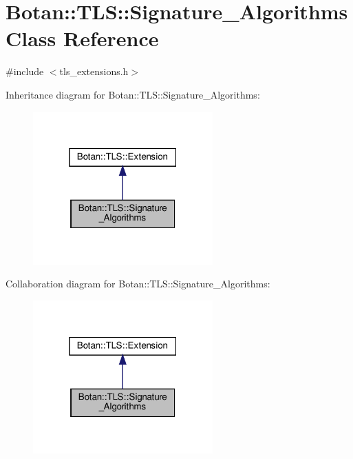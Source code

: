 \hypertarget{class_botan_1_1_t_l_s_1_1_signature___algorithms}{}\section{Botan\+:\+:T\+LS\+:\+:Signature\+\_\+\+Algorithms Class Reference}
\label{class_botan_1_1_t_l_s_1_1_signature___algorithms}


{\ttfamily \#include $<$tls\+\_\+extensions.\+h$>$}



Inheritance diagram for Botan\+:\+:T\+LS\+:\+:Signature\+\_\+\+Algorithms\+:
\nopagebreak
\begin{figure}[H]
\begin{center}
\leavevmode
\includegraphics[width=196pt]{class_botan_1_1_t_l_s_1_1_signature___algorithms__inherit__graph}
\end{center}
\end{figure}


Collaboration diagram for Botan\+:\+:T\+LS\+:\+:Signature\+\_\+\+Algorithms\+:
\nopagebreak
\begin{figure}[H]
\begin{center}
\leavevmode
\includegraphics[width=196pt]{class_botan_1_1_t_l_s_1_1_signature___algorithms__coll__graph}
\end{center}
\end{figure}
